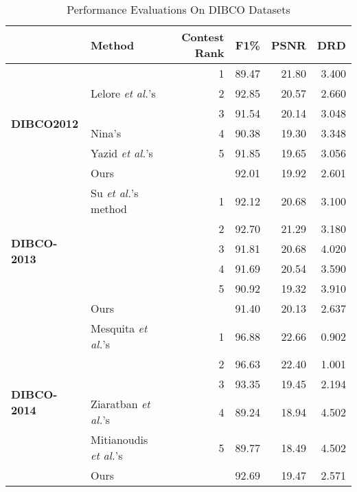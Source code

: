 \documentclass[onecolumn,11pt,draftcls,journal]{IEEEtran}
\def\etal{{\textit{et al.}}}
\begin{document}
\begin{table}[!h]
\centering\scriptsize
\caption{ Performance Evaluations On DIBCO Datasets}
\begin{tabular}{l|lrrrr}
\hline
&\bf{Method} & \bf{Contest Rank} & \bf{F1}\% & \bf{PSNR} & \bf{DRD} \\\hline
\multirow{6}{*}{\begin{sideways}{\bf{DIBCO2012}}\end{sideways}}&\cite{Howe2011} & 1 & 89.47 & 21.80 & 3.400\\
&Lelore \etal's \cite{DIBCO2012}   & 2 & 92.85 & 20.57 & 2.660\\
&\cite{Su2009}  & 3 & 91.54 & 20.14 & 3.048\\
&Nina's \cite{DIBCO2012}    & 4 & 90.38 & 19.30 & 3.348\\
&Yazid \etal's  \cite{DIBCO2012} & 5 & 91.85 & 19.65 & 3.056\\\cline{2-6}
&Ours   &   & 92.01 & 19.92 & 2.601\\
\hline
\multirow{6}{*}{\begin{sideways}{\bf{DIBCO-2013}}\end{sideways}}&Su \etal 's method \cite{DIBCO2013} & 1 & 92.12 & 20.68 & 3.100 \\
&\cite{Howe2013}  & 2 & 92.70 & 21.29 & 3.180 \\
&\cite{EoE2012}  & 3 & 91.81 & 20.68 & 4.020 \\
&\cite{6482566} & 4 & 91.69 & 20.54 & 3.590 \\
&\cite{ramirez2010transition}   & 5 & 90.92 & 19.32 & 3.910 \\\cline{2-6}
&Ours   &   & 91.40 & 20.13 & 2.637\\
\hline
\multirow{6}{*}{\begin{sideways}{\bf{DIBCO-2014}}\end{sideways}}&Mesquita \etal 's \cite{DIBCO2014} & 1 & 96.88 & 22.66 & 0.902 \\
&\cite{Howe2013}  & 2 & 96.63 & 22.40 & 1.001 \\
&\cite{nafchi2013historical}  & 3 & 93.35 & 19.45 & 2.194 \\
&Ziaratban \etal 's \cite{DIBCO2014}   & 4 & 89.24 & 18.94 & 4.502 \\
&Mitianoudis \etal 's \cite{DIBCO2014}      & 5 & 89.77 & 18.49 & 4.502 \\\cline{2-6}
&Ours   &   & 92.69 & 19.47 & 2.571\\
\hline
\end{tabular}
\end{table}
\end{document}
